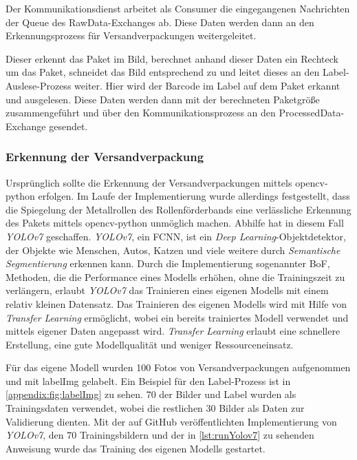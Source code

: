 Der Kommunikationsdienst arbeitet als Consumer die eingegangenen Nachrichten der Queue des RawData-Exchanges ab. Diese Daten werden dann an den Erkennungsprozess für Versandverpackungen weitergeleitet.

Dieser erkennt das Paket im Bild, berechnet anhand dieser Daten ein Rechteck um das Paket, schneidet das Bild entsprechend zu und leitet dieses an den Label-Auslese-Prozess weiter. Hier wird der Barcode im Label auf dem Paket erkannt und ausgelesen. Diese Daten werden dann mit der berechneten Paketgröße zusammengeführt und über den Kommunikationsprozess an den ProcessedData-Exchange gesendet.


\subsubsection{Erkennung der Versandverpackung}\label{ssec:erkennung_versandverpackung}

Ursprünglich sollte die Erkennung der Versandverpackungen mittels opencv-python erfolgen. Im Laufe der Implementierung wurde allerdings festgestellt, dass die Spiegelung der Metallrollen des Rollenförderbands eine verlässliche Erkennung des Pakets mittels opencv-python unmöglich machen. Abhilfe hat in diesem Fall \textit{\gls{YOLOv7}} geschaffen. \textit{\gls{YOLOv7}}, ein \acl{FCNN}, ist ein \textit{\gls{Deep Learning}}-Objektdetektor, der Objekte wie Menschen, Autos, Katzen und viele weitere durch \textit{\gls{Semantische Segmentierung}} erkennen kann. Durch die Implementierung sogenannter \ac{BoF}, Methoden, die die Performance eines Modells erhöhen, ohne die Trainingszeit zu verlängern, erlaubt \textit{\gls{YOLOv7}} das Trainieren eines eigenen Modells mit einem relativ kleinen Datensatz. \autocite{yolov7} Das Trainieren des eigenen Modells wird mit Hilfe von \textit{\gls{Transfer Learning}} ermöglicht, wobei ein bereits trainiertes Modell verwendet und mittels eigener Daten angepasst wird. \textit{\gls{Transfer Learning}} erlaubt eine schnellere Erstellung, eine gute Modellqualität und weniger Ressourceneinsatz. \autocite{wuttke_transfer}

Für das eigene Modell wurden 100 Fotos von Versandverpackungen aufgenommen und mit labelImg gelabelt. Ein Beispiel für den Label-Prozess ist in \vref{appendix:fig:labelImg} zu sehen. 70 der Bilder und Label wurden als Trainingsdaten verwendet, wobei die restlichen 30 Bilder als Daten zur Validierung dienten. Mit der auf GitHub veröffentlichten Implementierung von \textit{\gls{YOLOv7}}, den 70 Trainingsbildern und der in \vref{lst:runYolov7} zu sehenden Anweisung wurde das Training des eigenen Modells gestartet.

